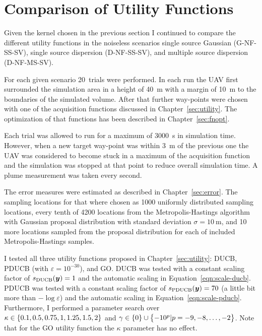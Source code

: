 \section{Comparison of Utility Functions}\label{sec:cmputility}
Given the kernel chosen in the previous section I continued to compare the 
different utility functions in the noiseless scenarios single source Gaussian 
(G-NF-SS-SV), single source dispersion (D-NF-SS-SV), and multiple source 
dispersion (D-NF-MS-SV).

For each given scenario 20~trials were performed. In each run the UAV first 
surrounded the simulation area in a height of \SI{40}{\meter} with a margin of 
\SI{10}{\meter} to the boundaries of the simulated volume. After that further 
way-points were chosen with one of the acquisition functions discussed in 
Chapter~\ref{sec:utility}. The optimization of that functions has been described 
in Chapter~\ref{sec:fnopt}.

Each trial was allowed to run for a maximum of \SI{3000}{\second} in simulation 
time. However, when a new target way-point was within \SI{3}{\meter} of the 
previous one the UAV was considered to become stuck in a maximum of the 
acquisition function and the simulation was stopped at that point to reduce 
overall simulation time. A plume measurement was taken every second.

The error measures were estimated as described in Chapter~\ref{sec:error}. The 
sampling locations for that where chosen as 1000 uniformly distributed sampling 
locations, every tenth of 4200 locations from the Metropolis-Hastings algorithm 
with Gaussian proposal distribution with standard deviation $\sigma 
= \SI{10}{\meter}$, and 10 more locations sampled from the proposal distribution 
for each of included Metropolis-Hastings samples.

I tested all three utility functions proposed in Chapter~\ref{sec:utility}: 
DUCB, PDUCB (with $\varepsilon = 10^{-30}$), and GO\@. DUCB was tested with 
a constant scaling factor of $s_{\mathrm{DUCB}}(\bm{y}) = 1$ and the automatic scaling 
in Equation~\ref{eqn:scale-ducb}.  PDUCB was tested with a constant scaling 
factor of $s_{\mathrm{PDUCB}}(\bm{y}) = 70$ (a little bit more than $-\log 
\varepsilon$) and the automatic scaling in Equation~\ref{eqn:scale-pducb}.  
Furthermore, I performed a parameter search over $\kappa \in \cbr{0.1, 0.5, 
0.75, 1, 1.25, 1.5, 2}$ and $\gamma \in \cbr{0} \cup \cbr{-10^p | p = -9, -8, 
  \dots, -2}$. Note that for the GO utility function the $\kappa$ parameter has 
no effect.

